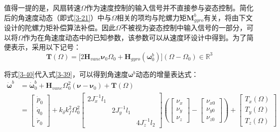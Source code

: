 值得一提的是，风扇转速$\Omega$作为速度控制的输入信号并不直接参与姿态控制。简化后的角速度动态（即式\eqref{3-21}）中与$\Omega$相关的项均与陀螺力矩$\boldsymbol{M}_{gyro}^b$有关，将由下文设计的陀螺力矩补偿算法补偿。因此$\Omega$不被视为姿态控制中输入信号的一部分，可以将$\Omega$作为在角速度动态中的已知参数，该参数可以从速度环设计中得到。为了简便表示，采用以下记号：
\begin{equation}
    \boldsymbol{T}(\Omega)=\big[2\boldsymbol{H}_{vane}\boldsymbol{\nu}_0\Omega_0+\boldsymbol{H}_{gyro}(\boldsymbol{\omega}_0^b)\big](\Omega-\Omega_0)\in\mathbb{R}^3
    \label{3-40}
\end{equation}

将式\eqref{3-40}代入式\eqref{3-39}，可以得到角速度$\boldsymbol{\omega}^b$动态的增量表达式：
\begin{equation}
    \begin{aligned}
    \boldsymbol{\dot{\omega}}^b&=\boldsymbol{\dot{\omega}}_0^b+\boldsymbol{H}_{vane}\Omega_0^2(\boldsymbol{\nu}-\boldsymbol{\nu}_0)+\boldsymbol{T}(\Omega)\\
    &=\begin{bmatrix}\dot{p}_0 \\ \dot{q}_0 \\ \dot{r}_0 \end{bmatrix}
    + k_{\delta}k_f^2\Omega_0^2
    \left[\begin{array}{ccc}2J_x^{-1}l_1 & & \\& 2J_y^{-1}l_1 & \\& & 4J_z^{-1}l_2\end{array}\right]
    \left(\begin{bmatrix}\nu_{x} \\ \nu_{y} \\ \nu_{z}\end{bmatrix}
    -\begin{bmatrix}\nu_{x0} \\ \nu_{y0} \\ \nu_{z0}\end{bmatrix}\right)
    +  \begin{bmatrix}T_{x}(\Omega) \\ T_{y}(\Omega) \\ T_{z}(\Omega)
    \end{bmatrix}
    \end{aligned}
    \label{3-41}
\end{equation}

